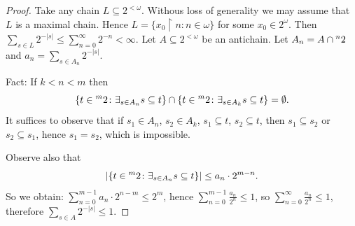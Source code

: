 \documentclass[12pt]{amsart}
\theoremstyle{plain}
\theoremstyle{definition}
\theoremstyle{remark}
\newcommand{\ca}{2^{\omega}}
\newcommand{\cantor}{\ca}
\newcommand{\ensembleDeFonctions}[2]{\prescript{#1}{}{#2}}
\begin{document}
\begin{proof}
Take any chain $L \subseteq 2^{<\omega}$.
Withous loss of generality we may assume that $L$ is a maximal chain.
Hence $L = \lbrace x_0 \restriction n \colon n \in \omega \rbrace$ for
some $x_0 \in \cantor$. Then
$\sum_{s \in L} 2^{-|s|} \leq \sum_{n = 0}^\infty 2^{-n} < \infty$.
Let $A\subseteq 2^{<\omega}$ be an antichain.
Let
$A_n =  A \cap \ensembleDeFonctions{n}{2}$ and
$a_n = \sum_{s \in A_n} 2^{-|s|}$.

  Fact:
  If $k < n < m$ then
  \[
    \{ t \in \ensembleDeFonctions{m}{2} \colon \exists_{s\in A_n} s \subseteq t \} \cap
    \{ t \in \ensembleDeFonctions{m}{2} \colon \exists_{s\in A_k} s \subseteq t \} = \emptyset.
  \]
  It suffices to observe that if $s_1 \in A_n$, $s_2 \in A_k$, $s_1 \subseteq t$, $s_2 \subseteq t$,
  then $s_1 \subseteq s_2$ or $s_2 \subseteq s_1$, hence $s_1 = s_2$, which is impossible.

  Observe also that
  \[
    |\lbrace t \in \ensembleDeFonctions{m}{2} \colon \exists_{s \in A_n} s \subseteq t\rbrace| \leq
    a_n \cdot 2^{m-n}.
  \]
  So we obtain:
  $\sum_{n=0}^{m-1} a_n \cdot 2^{n-m} \leq 2^m$,
  hence
  $\sum_{n=0}^{m-1} \frac{a_n}{2^n} \leq 1$,
  so
  $\sum_{n=0}^{\infty} \frac{a_n}{2^n} \leq 1$,
  therefore
  $\sum_{s \in A} 2^{-|s|} \leq 1$.
\end{proof}

\printbibliography
\end{document}
